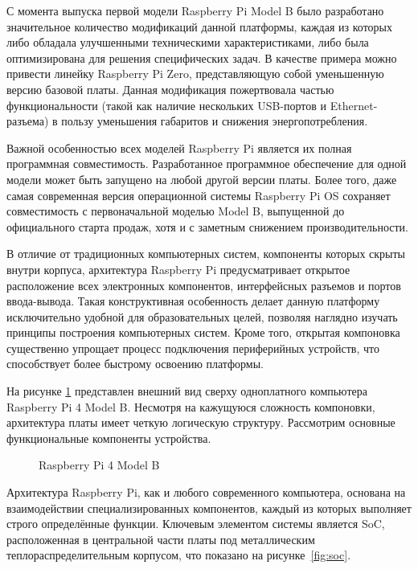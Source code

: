 С момента выпуска первой модели Raspberry Pi Model B было разработано значительное количество модификаций данной платформы, каждая из которых либо обладала улучшенными техническими характеристиками, либо была оптимизирована для решения специфических задач. В качестве примера можно привести линейку Raspberry Pi Zero, представляющую собой уменьшенную версию базовой платы. Данная модификация пожертвовала частью функциональности (такой как наличие нескольких USB-портов и Ethernet-разъема) в пользу уменьшения габаритов и снижения энергопотребления.

Важной особенностью всех моделей Raspberry Pi является их полная программная совместимость. Разработанное программное обеспечение для одной модели может быть запущено на любой другой версии платы. Более того, даже самая современная версия операционной системы Raspberry Pi OS сохраняет совместимость с первоначальной моделью Model B, выпущенной до официального старта продаж, хотя и с заметным снижением производительности.

В отличие от традиционных компьютерных систем, компоненты которых скрыты внутри корпуса, архитектура Raspberry Pi предусматривает открытое расположение всех электронных компонентов, интерфейсных разъемов и портов ввода-вывода. Такая конструктивная особенность делает данную платформу исключительно удобной для образовательных целей, позволяя наглядно изучать принципы построения компьютерных систем. Кроме того, открытая компоновка существенно упрощает процесс подключения периферийных устройств, что способствует более быстрому освоению платформы.

На рисунке \ref{fig:raspberry4B} представлен внешний вид сверху одноплатного компьютера Raspberry Pi 4 Model B. Несмотря на кажущуюся сложность компоновки, архитектура платы имеет четкую логическую структуру. Рассмотрим основные функциональные компоненты устройства.

\begin{figure}[H]
	\centering
	\caption{Raspberry Pi 4 Model B}
	\label{fig:raspberry4B}
\end{figure}

Архитектура Raspberry Pi, как и любого современного компьютера, основана на взаимодействии специализированных компонентов, каждый из которых выполняет строго определённые функции. Ключевым элементом системы является SoC, расположенная в центральной части платы под металлическим теплораспределительным корпусом, что показано на рисунке~\ref{fig:soc}. 

